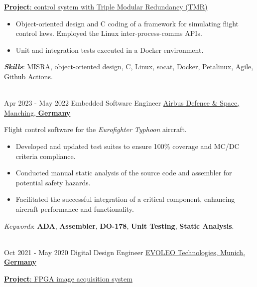 \documentclass[letterpaper]{twentysecondcv} %
\begin{document}
\begin{twenty}
{            \vspace{2 mm}
            \underline{\textbf{Project}: control system with Triple Modular Redundancy (TMR)}

            \vspace{2 mm}
            \begin{itemize}
                \item Object-oriented design and C coding of a framework for simulating flight control laws. Employed the Linux inter-process-comms APIs.
                \item Unit and integration tests executed in a Docker environment.
            \end{itemize}

            \vspace{2 mm}
            \textbf{\textit{Skills}}: MISRA, object-oriented design, C, Linux, socat, Docker, Petalinux, Agile, Github Actions.
        }\\
    \twentyitem
        {Apr 2023 -}
        {May 2022}
        {Embedded Software Engineer}
        {\href{https://www.airbus.com/en/who-we-are}{Airbus Defence \& Space, Manching, \textbf{Germany}}}
        {}
        {
            Flight control software for the \textit{Eurofighter Typhoon} aircraft.
            \vspace{1 mm}
            \begin{itemize}
                \item Developed and updated test suites to ensure 100\% coverage and MC/DC criteria compliance.
                \item Conducted manual static analysis of the source code and assembler for potential safety hazards.
                \item Facilitated the successful integration of a critical component, enhancing aircraft performance and functionality.
            \end{itemize}

            \vspace{1 mm}
            \textit{Keywords}: \textbf{ADA}, \textbf{Assembler}, \textbf{DO-178}, \textbf{Unit Testing}, \textbf{Static Analysis}.
        }\\
    \twentyitem
        {Oct 2021 -}
    	{May 2020}
        {Digital Design Engineer}
        {\href{http://evoleotech.com/company/}{EVOLEO Technologies, Munich, \textbf{Germany}}}
        {}
        {
            \vspace{2 mm}
            \underline{\textbf{Project}: FPGA image acquisition system}

}
\end{twenty}
\end{document}
